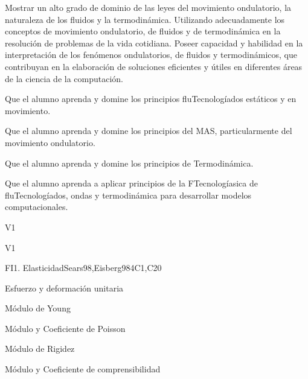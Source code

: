 \begin{syllabus}


\begin{justification}
Mostrar un alto grado de dominio de las leyes del movimiento ondulatorio, la naturaleza de los fluidos y la termodinámica. Utilizando adecuadamente los conceptos de movimiento ondulatorio, de fluidos y de termodinámica en la resolución de problemas de la vida cotidiana. Poseer capacidad y habilidad en la interpretación de los fenómenos ondulatorios, de fluidos y termodinámicos, que contribuyan en la elaboración de soluciones eficientes y útiles en diferentes áreas de la ciencia de la computación.
\end{justification}

\begin{goals}
\item  Que el alumno aprenda y domine los principios fluTecnologíados estáticos y en movimiento.
\item  Que el alumno aprenda y domine los principios del MAS, particularmente del movimiento ondulatorio.
\item  Que el alumno aprenda y domine los principios de Termodinámica.
\item  Que el alumno aprenda a aplicar principios de la FTecnologíasica de fluTecnologíados, ondas y termodinámica para desarrollar modelos computacionales.
\end{goals}

\begin{outcomes}{V1}
  \item {}
  \item {}
  \item {}
\end{outcomes}

\begin{competences}{V1}
    \item {}
    \item {}
\end{competences}

\begin{unit}{FI1. Elasticidad}{}{Sears98,Eisberg98}{4}{C1,C20}
\begin{topics}
         \item  Esfuerzo y deformación unitaria
	 \item  Módulo de Young
         \item  Módulo y Coeficiente de Poisson
	 \item  Módulo de Rigidez
         \item  Módulo y Coeficiente de comprensibilidad
   \end{topics}


\end{unit}
\end{syllabus}
